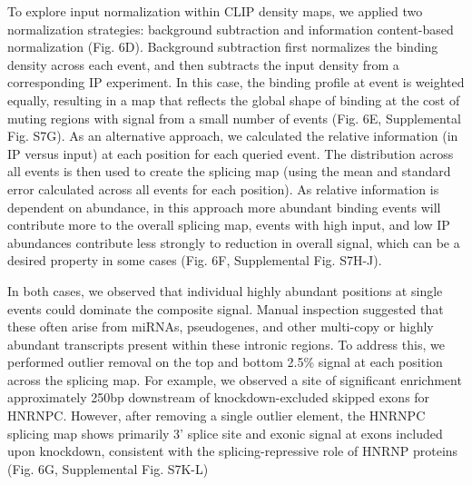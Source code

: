 To explore input normalization within CLIP density maps, we applied two normalization strategies: background subtraction and information content-based normalization (Fig. 6D). Background subtraction first normalizes the binding density across each event, and then subtracts the input density from a corresponding IP experiment. In this case, the binding profile at event is weighted equally, resulting in a map that reflects the global shape of binding at the cost of muting regions with signal from a small number of events (Fig. 6E, Supplemental Fig. S7G). As an alternative approach, we calculated the relative information (in IP versus input) at each position for each queried event. The distribution across all events is then used to create the splicing map (using the mean and standard error calculated across all events for each position). As relative information is dependent on abundance, in this approach more abundant binding events will contribute more to the overall splicing map, events with high input, and low IP abundances contribute less strongly to reduction in overall signal, which can be a desired property in some cases (Fig. 6F, Supplemental Fig. S7H-J).

In both cases, we observed that individual highly abundant positions at single events could dominate the composite signal. Manual inspection suggested that these often arise from miRNAs, pseudogenes, and other multi-copy or highly abundant transcripts present within these intronic regions. To address this, we performed outlier removal on the top and bottom 2.5\% signal at each position across the splicing map. For example, we observed a site of significant enrichment approximately 250bp downstream of knockdown-excluded skipped exons for HNRNPC. However, after removing a single outlier element, the HNRNPC splicing map shows primarily 3’ splice site and exonic signal at exons included upon knockdown, consistent with the splicing-repressive role of HNRNP proteins (Fig. 6G, Supplemental Fig. S7K-L)

